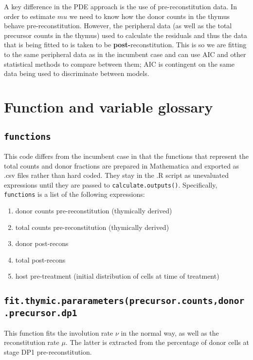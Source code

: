 \documentclass{tufte-book} %
\begin{document}
A key difference in the PDE approach is the use of pre-reconstitution data. In order to estimate $mu$ we need to know how the donor counts in the thymus behave pre-reconstitution. However, the peripheral data (as well as the total precursor counts in the thymus) used to calculate the residuals and thus the data that is being fitted to is taken to be \textbf{post-}reconstitution. This is so we are fitting to the same peripheral data as in the incumbent case and can use AIC and other statistical methods to compare between them; AIC is contingent on the same data being used to discriminate between models.


\section{Function and variable glossary}
\subsection{\texttt{functions}}
This code differs from the incumbent case in that the functions that represent the total counts and donor fractions are prepared in Mathematica and exported as .csv files rather than hard coded. They stay in the .R script as unevaluated expressions until they are passed to \texttt{calculate.outputs()}. Specifically, \texttt{functions} is a list of the following expressions:
\begin{enumerate}
\item donor counts pre-reconstitution (thymically derived)
\item total counts pre-reconstitution (thymically derived)
\item donor post-recons
\item total post-recons
\item host pre-treatment (initial distribution of cells at time of treatment)
\end{enumerate}

\subsection{\texttt{fit.thymic.pararameters(precursor.counts,donor.precursor.dp1}}
This function fits the involution rate $\nu$ in the normal way, as well as the reconstitution rate $\mu$. The latter is extracted from the percentage of donor cells at stage DP1 pre-reconstitution.
\end{document}
